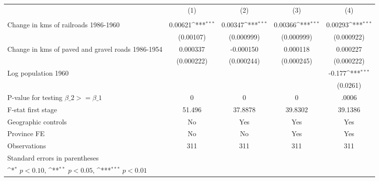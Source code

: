 {
\def\sym#1{\ifmmode^{#1}\else\(^{#1}\)\fi}
\begin{tabular}{l*{4}{c}}
\hline\hline
                &\multicolumn{1}{c}{(1)}&\multicolumn{1}{c}{(2)}&\multicolumn{1}{c}{(3)}&\multicolumn{1}{c}{(4)}\\
                &\multicolumn{1}{c}{}&\multicolumn{1}{c}{}&\multicolumn{1}{c}{}&\multicolumn{1}{c}{}\\
\hline
Change in kms of railroads 1986-1960&  0.00621\sym{***}&  0.00347\sym{***}&  0.00366\sym{***}&  0.00293\sym{***}\\
                &(0.00107)         &(0.000999)         &(0.000999)         &(0.000922)         \\
[1em]
Change in kms of paved and gravel roads 1986-1954& 0.000337         &-0.000150         & 0.000118         & 0.000227         \\
                &(0.000222)         &(0.000244)         &(0.000245)         &(0.000222)         \\
[1em]
Log population 1960&                  &                  &                  &   -0.177\sym{***}\\
                &                  &                  &                  & (0.0261)         \\
\hline
P-value for testing $\beta\_{2} >= \beta\_{1}$&        0         &        0         &        0         &    .0006         \\
F-stat first stage&   51.496         &  37.8878         &  39.8302         &  39.1386         \\
Geographic controls&       No         &      Yes         &      Yes         &      Yes         \\
Province FE     &       No         &       No         &      Yes         &      Yes         \\
Observations    &      311         &      311         &      311         &      311         \\
\hline\hline
\multicolumn{5}{l}{\footnotesize Standard errors in parentheses}\\
\multicolumn{5}{l}{\footnotesize \sym{*} \(p<0.10\), \sym{**} \(p<0.05\), \sym{***} \(p<0.01\)}\\
\end{tabular}
}
